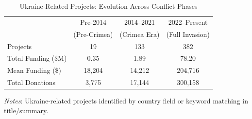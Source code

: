 \begin{table}[htbp]
\centering
\caption{Ukraine-Related Projects: Evolution Across Conflict Phases}
\label{tab:ukraine_descriptive}
\begin{threeparttable}
\begin{tabular}{lccc}
\toprule
& Pre-2014 & 2014--2021 & 2022--Present \\
& (Pre-Crimea) & (Crimea Era) & (Full Invasion) \\
\midrule
Projects & 19 & 133 & 382 \\
Total Funding (\$M) & 0.35 & 1.89 & 78.20 \\
Mean Funding (\$) & 18,204 & 14,212 & 204,716 \\
Total Donations & 3,775 & 17,144 & 300,158 \\
\bottomrule
\end{tabular}
\begin{tablenotes}
\small
\item \textit{Notes}: Ukraine-related projects identified by country field or keyword matching in title/summary.
\end{tablenotes}
\end{threeparttable}
\end{table}

